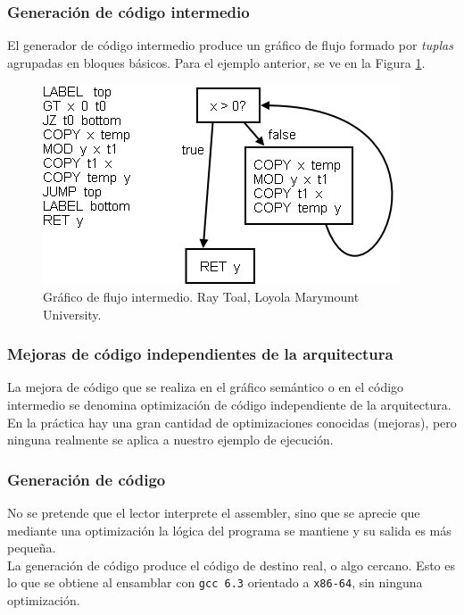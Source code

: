 \subsubsection{Generación de código intermedio}
El generador de código intermedio produce un gráfico de flujo formado por \textit{tuplas} agrupadas en bloques básicos. Para el ejemplo anterior, se ve en la Figura \ref{fig:flowchart intermediate}.\\

\begin{figure}[ht]
    \centering
    \includegraphics[scale=0.3]{images/gcdflowgraph.png}
    \caption{Gráfico de flujo intermedio. Ray Toal, Loyola Marymount University.}
    \label{fig:flowchart intermediate}
\end{figure}

\subsubsection{Mejoras de código independientes de la arquitectura}
La mejora de código que se realiza en el gráfico semántico o en el código intermedio se denomina optimización de código independiente de la arquitectura. En la práctica hay una gran cantidad de optimizaciones conocidas\cite{srikant2018compiler}\cite{emmanuel2017newtrends} (mejoras), pero ninguna realmente se aplica a nuestro ejemplo de ejecución.

\subsubsection{Generación de código}
No se pretende que el lector interprete el assembler, sino que se aprecie que mediante una optimización la lógica del programa se mantiene y su salida es más pequeña.\\

La generación de código produce el código de destino real, o algo cercano. Esto es lo que se obtiene al ensamblar con \texttt{gcc 6.3} orientado a \texttt{x86-64}, sin ninguna optimización.

